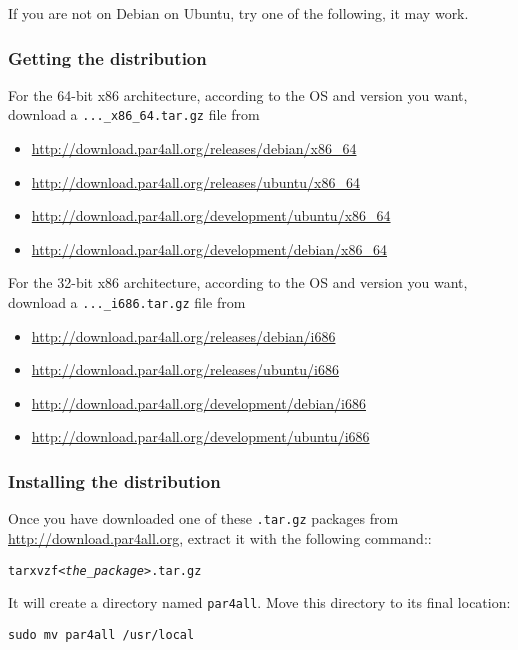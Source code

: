 \documentclass[a4paper]{article}
\begin{document}
If you are not on Debian on Ubuntu, try one of the following, it may work.


\subsubsection{Getting the distribution}

For the 64-bit x86 architecture, according to the OS and version you want,
download a \texttt{...\_x86\_64.tar.gz} file from

\begin{itemize}
\item \protect\url{http://download.par4all.org/releases/debian/x86_64}
\item \protect\url{http://download.par4all.org/releases/ubuntu/x86_64}
\item \protect\url{http://download.par4all.org/development/ubuntu/x86_64}
\item \protect\url{http://download.par4all.org/development/debian/x86_64}
\end{itemize}

For the 32-bit x86 architecture, according to the OS and version you want,
download a \texttt{...\_i686.tar.gz} file from
\begin{itemize}
\item \protect\url{http://download.par4all.org/releases/debian/i686}
\item \protect\url{http://download.par4all.org/releases/ubuntu/i686}
\item \protect\url{http://download.par4all.org/development/debian/i686}
\item \protect\url{http://download.par4all.org/development/ubuntu/i686}
\end{itemize}


\subsubsection{Installing the distribution}

Once you have downloaded one of these \texttt{.tar.gz} packages from
\url{http://download.par4all.org}, extract it with the following command::
\begin{alltt}
tar xvzf \emph{<the_package>}.tar.gz
\end{alltt}

It will create a directory named \texttt{par4all}. Move this directory to its final
location:
\begin{verbatim}
sudo mv par4all /usr/local
\end{verbatim}
\end{document}
